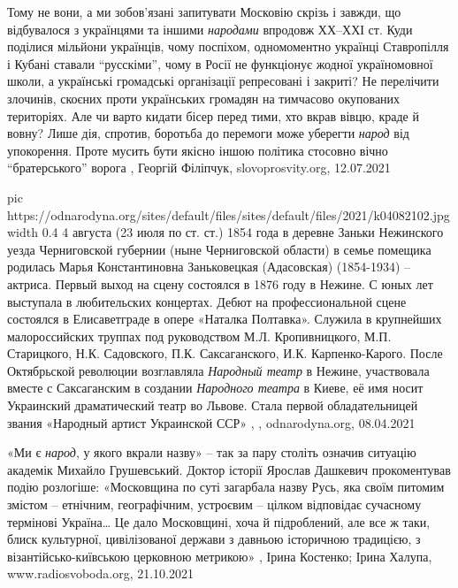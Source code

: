 Тому не вони, а ми зобов’язані запитувати Московію скрізь і завжди, що
відбувалося з українцями та іншими \emph{народами} впродовж ХХ–ХХІ ст. Куди поділися
мільйони українців, чому поспіхом, одномоментно українці Ставропілля і Кубані
ставали \enquote{русскіми}, чому в Росії не функціонує жодної україномовної школи, а
українські громадські організації репресовані і закриті?  Не перелічити
злочинів, скоєних проти українських громадян на тимчасово окупованих
територіях. Але чи варто кидати бісер перед тими, хто вкрав вівцю, краде й
вовну? Лише дія, спротив, боротьба до перемоги може уберегти \emph{народ} від
упокорення. Проте мусить бути якісно іншою політика стосовно вічно
\enquote{братерського} ворога
, Георгій Філіпчук, slovoprosvity.org, 12.07.2021

\ifcmt
  pic https://odnarodyna.org/sites/default/files/sites/default/files/2021/k04082102.jpg
  width 0.4
\fi
4 августа (23 июля по ст. ст.) 1854 года в деревне Заньки Нежинского уезда
Черниговской губернии (ныне Черниговской области) в семье помещика родилась
Марья Константиновна Заньковецкая (Адасовская) (1854-1934) – актриса. Первый
выход на сцену состоялся в 1876 году в Нежине. С юных лет выступала в
любительских концертах. Дебют на профессиональной сцене состоялся в
Елисаветграде в опере «Наталка Полтавка». Служила в крупнейших малороссийских
труппах под руководством М.Л. Кропивницкого, М.П. Старицкого, Н.К. Садовского,
П.К. Саксаганского, И.К. Карпенко-Карого. После Октябрьской революции
возглавляла \emph{Народный театр} в Нежине, участвовала вместе с Саксаганским в
создании \emph{Народного театра} в Киеве, её имя носит Украинский драматический театр
во Львове. Стала первой обладательницей звания «Народный артист Украинской ССР»
, , odnarodyna.org, 08.04.2021

«Ми є \emph{народ}, у якого вкрали назву» – так за пару століть означив ситуацію
академік Михайло Грушевський.  Доктор історії Ярослав Дашкевич прокоментував
подію розлогіше: «Московщина по суті загарбала назву Русь, яка своїм питомим
змістом – етнічним, географічним, устроєвим – цілком відповідає сучасному
термінові Україна… Це дало Московщині, хоча й підроблений, але все ж таки,
блиск культурної, цивілізованої держави з давньою історичною традицією, з
візантійсько-київською церковною метрикою»
, 
Ірина Костенко; Ірина Халупа, www.radiosvoboda.org, 21.10.2021
